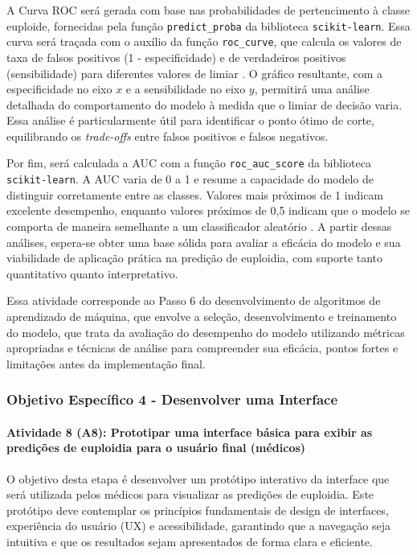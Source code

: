 A Curva ROC será gerada com base nas probabilidades de pertencimento à classe euploide, fornecidas pela função \texttt{predict\_proba} da biblioteca \texttt{scikit-learn}. Essa curva será traçada com o auxílio da função \texttt{roc\_curve}, que calcula os valores de taxa de falsos positivos (1 - especificidade) e de verdadeiros positivos (sensibilidade) para diferentes valores de limiar \cite{vilela2022}. O gráfico resultante, com a especificidade no eixo \(x\) e a sensibilidade no eixo \(y\), permitirá uma análise detalhada do comportamento do modelo à medida que o limiar de decisão varia. Essa análise é particularmente útil para identificar o ponto ótimo de corte, equilibrando os \textit{trade-offs} entre falsos positivos e falsos negativos.

Por fim, será calculada a AUC com a função \texttt{roc\_auc\_score} da biblioteca \texttt{scikit-learn}. A AUC varia de 0 a 1 e resume a capacidade do modelo de distinguir corretamente entre as classes. Valores mais próximos de 1 indicam excelente desempenho, enquanto valores próximos de 0{,}5 indicam que o modelo se comporta de maneira semelhante a um classificador aleatório \cite{vilela2022}. A partir dessas análises, espera-se obter uma base sólida para avaliar a eficácia do modelo e sua viabilidade de aplicação prática na predição de euploidia, com suporte tanto quantitativo quanto interpretativo.

Essa atividade corresponde ao Passo 6 do desenvolvimento de algoritmos de aprendizado de máquina, que envolve a seleção, desenvolvimento e treinamento do modelo, que trata da avaliação do desempenho do modelo utilizando métricas apropriadas e técnicas de análise para compreender sua eficácia, pontos fortes e limitações antes da implementação final.

\subsubsection{\textbf{Objetivo Específico 4} - Desenvolver uma Interface}

\paragraph{\textbf{Atividade 8 (A8):} Prototipar uma interface básica para exibir as predições de euploidia para o usuário final (médicos)}

O objetivo desta etapa é desenvolver um protótipo interativo da interface que será utilizada pelos médicos para visualizar as predições de euploidia. Este protótipo deve contemplar os princípios fundamentais de design de interfaces, experiência do usuário (UX) e acessibilidade, garantindo que a navegação seja intuitiva e que os resultados sejam apresentados de forma clara e eficiente.

